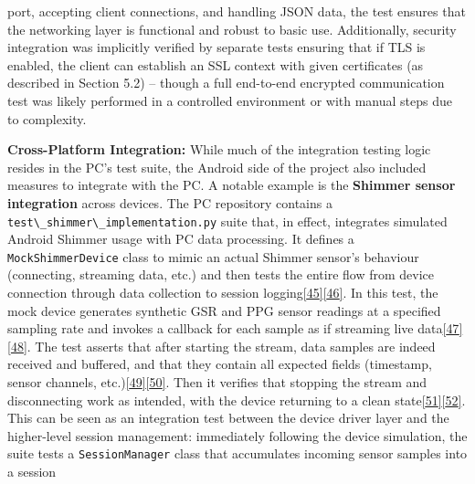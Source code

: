 \documentclass[12pt,a4paper]{article}
\begin{document}
port, accepting client connections, and handling JSON data, the test ensures that the networking layer is functional and robust to basic use. Additionally, security integration was implicitly verified by separate tests ensuring that if TLS is enabled, the client can establish an SSL context with given certificates (as described in Section 5.2) -- though a full end-to-end encrypted communication test was likely performed in a controlled environment or with manual steps due to complexity.

\textbf{Cross-Platform Integration:} While much of the integration testing logic resides in the PC's test suite, the Android side of the project also included measures to integrate with the PC. A notable example is the \textbf{Shimmer sensor integration} across devices. The PC repository contains a \passthrough{\lstinline!test\_shimmer\_implementation.py!} suite that, in effect, integrates simulated Android Shimmer usage with PC data processing. It defines a \passthrough{\lstinline!MockShimmerDevice!} class to mimic an actual Shimmer sensor's behaviour (connecting, streaming data, etc.) and then tests the entire flow from device connection through data collection to session logging\href{https://github.com/buccancs/bucika_gsr/blob/7048f7f6a7536f5cd577ed2184800d3dad97fd08/PythonApp/test_shimmer_implementation.py\#L127-L135}{{[}45{]}}\href{https://github.com/buccancs/bucika_gsr/blob/7048f7f6a7536f5cd577ed2184800d3dad97fd08/PythonApp/test_shimmer_implementation.py\#L154-L163}{{[}46{]}}. In this test, the mock device generates synthetic GSR and PPG sensor readings at a specified sampling rate and invokes a callback for each sample as if streaming live data\href{https://github.com/buccancs/bucika_gsr/blob/7048f7f6a7536f5cd577ed2184800d3dad97fd08/PythonApp/test_shimmer_implementation.py\#L161-L170}{{[}47{]}}\href{https://github.com/buccancs/bucika_gsr/blob/7048f7f6a7536f5cd577ed2184800d3dad97fd08/PythonApp/test_shimmer_implementation.py\#L174-L182}{{[}48{]}}. The test asserts that after starting the stream, data samples are indeed received and buffered, and that they contain all expected fields (timestamp, sensor channels, etc.)\href{https://github.com/buccancs/bucika_gsr/blob/7048f7f6a7536f5cd577ed2184800d3dad97fd08/PythonApp/test_shimmer_implementation.py\#L228-L237}{{[}49{]}}\href{https://github.com/buccancs/bucika_gsr/blob/7048f7f6a7536f5cd577ed2184800d3dad97fd08/PythonApp/test_shimmer_implementation.py\#L238-L246}{{[}50{]}}. Then it verifies that stopping the stream and disconnecting work as intended, with the device returning to a clean state\href{https://github.com/buccancs/bucika_gsr/blob/7048f7f6a7536f5cd577ed2184800d3dad97fd08/PythonApp/test_shimmer_implementation.py\#L230-L239}{{[}51{]}}\href{https://github.com/buccancs/bucika_gsr/blob/7048f7f6a7536f5cd577ed2184800d3dad97fd08/PythonApp/test_shimmer_implementation.py\#L242-L245}{{[}52{]}}. This can be seen as an integration test between the device driver layer and the higher-level session management: immediately following the device simulation, the suite tests a \passthrough{\lstinline!SessionManager!} class that accumulates incoming sensor samples into a session 
\end{document}
